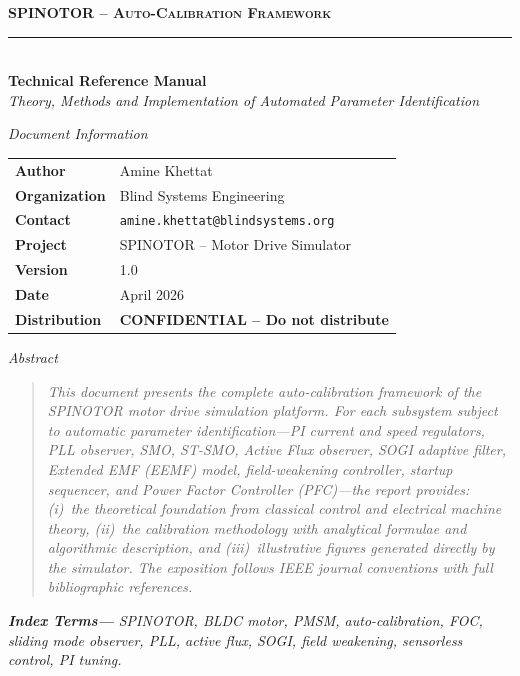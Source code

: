 \documentclass[10pt,twoside,a4paper]{article}
\begin{document}
\thispagestyle{fancy}

\vspace*{8mm}
\begin{center}
  {\large\bfseries\scshape\color{spinBlue} SPINOTOR -- Auto-Calibration Framework}\\[2pt]
  \textcolor{spinBlue}{\rule{\linewidth}{0.5pt}}\\[6pt]
  {\normalsize\bfseries Technical Reference Manual}\\[2pt]
  {\normalsize\itshape Theory, Methods and Implementation of Automated Parameter Identification}
\end{center}

\vspace{6mm}
{\itshape\color{spinLightBlue} Document Information}\\[3pt]
\begin{tabular}{@{}>{\bfseries}p{3.2cm}p{8.2cm}@{}}
  \rowcolor{spinBlue!12} Author       & Amine Khettat \\
  Organization                        & Blind Systems Engineering \\
  \rowcolor{spinBlue!8}  Contact      & \texttt{amine.khettat@blindsystems.org} \\
  Project                             & SPINOTOR -- Motor Drive Simulator \\
  \rowcolor{spinBlue!8}  Version      & 1.0 \\
  Date                                & April 2026 \\
  \rowcolor{spinRed!10}  Distribution & \textbf{\color{spinRed}CONFIDENTIAL -- Do not distribute} \\
\end{tabular}

\vspace{6mm}
{\itshape\color{spinLightBlue} Abstract}
\begin{quote}\small\itshape
This document presents the complete auto-calibration framework of the SPINOTOR motor
drive simulation platform. For each subsystem subject to automatic parameter
identification---PI current and speed regulators, PLL observer, SMO, ST-SMO, Active
Flux observer, SOGI adaptive filter, Extended EMF (EEMF) model, field-weakening
controller, startup sequencer, and Power Factor Controller (PFC)---the report provides:
\emph{(i)}~the theoretical foundation from classical control and electrical machine theory,
\emph{(ii)}~the calibration methodology with analytical formulae and algorithmic
description, and \emph{(iii)}~illustrative figures generated directly by the simulator.
The exposition follows IEEE journal conventions with full bibliographic references.
\end{quote}
\noindent\textbf{\small\itshape Index Terms---}%
{\small\itshape SPINOTOR, BLDC motor, PMSM, auto-calibration, FOC, sliding mode
observer, PLL, active flux, SOGI, field weakening, sensorless control, PI tuning.}
\end{document}
